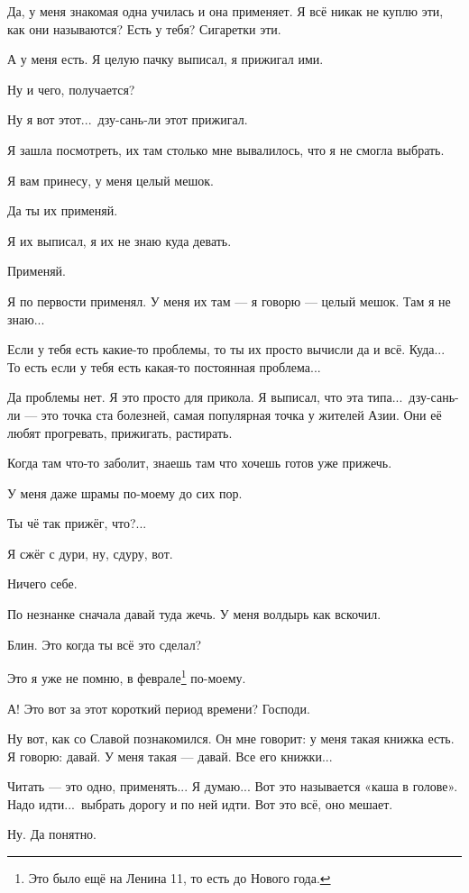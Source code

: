 \M
Да, у меня знакомая одна училась и она применяет. Я всё никак не куплю эти, как они называются?
Есть у тебя? Сигаретки эти.

\I
А у меня есть. Я целую пачку выписал, я прижигал ими.

\M
Ну и чего, получается?

\I
Ну я вот этот...\ дзу-сань-ли этот прижигал.

\M
Я зашла посмотреть, их там столько мне вывалилось, что я не смогла выбрать.

\I
Я вам принесу, у меня целый мешок.

\M
Да ты их применяй.

\I
Я их выписал, я их не знаю куда девать.

\M
Применяй.

\I
Я по первости применял. У меня их там --- я говорю --- целый мешок.
Там я не знаю...

\M
Если у тебя есть какие-то проблемы, то ты их просто вычисли да и всё.
Куда... То есть если у тебя есть какая-то постоянная проблема...

\I
Да проблемы нет. Я это просто для прикола.
Я выписал, что эта типа...\ дзу-сань-ли --- это точка ста болезней,
самая популярная точка у жителей Азии. Они её любят прогревать, прижигать, растирать.

\M
Когда там что-то заболит, знаешь там что хочешь готов уже прижечь.

\I
У меня даже шрамы
по-моему до сих пор.

\M
Ты чё так прижёг, что?...

\I
Я сжёг с дури, ну, сдуру, вот.

\M
Ничего себе.

\I
По незнанке сначала давай туда жечь. У меня волдырь как вскочил.

\M
Блин. Это когда ты всё это сделал?

\I
Это я уже не помню, в феврале\footnote*{Это было ещё на Ленина 11, то есть до Нового года.} по-моему.

\M
А! Это вот за этот короткий период времени?
Господи.

\I
Ну вот, как со Славой познакомился.
Он мне говорит: у меня такая книжка есть. Я говорю: давай. У меня такая --- давай.
Все его книжки...

\M
Читать --- это одно, применять...
Я думаю... Вот это называется «каша в голове». Надо идти...\ выбрать
дорогу и по ней идти. Вот это всё, оно мешает.

\I
Ну. Да понятно.

